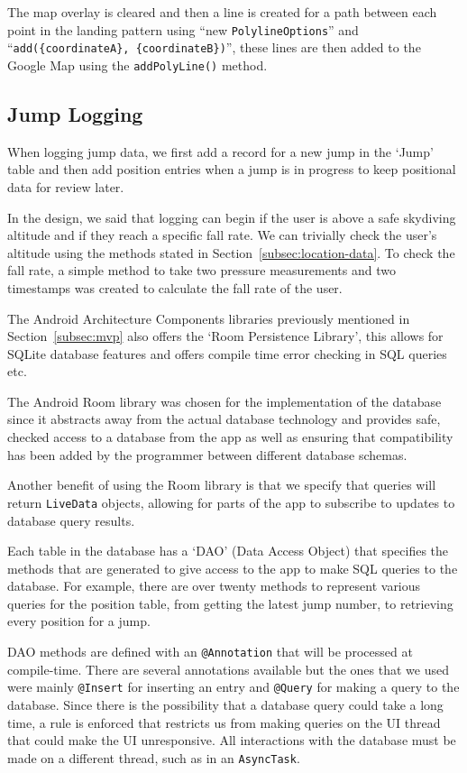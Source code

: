 The map overlay is cleared and then a line is created for a path between each point in the landing pattern using ``new \texttt{PolylineOptions}'' and ``\verb|add({coordinateA}, {coordinateB})|'', these lines are then added to the Google Map using the \texttt{addPolyLine()} method.

\newpage
\subsection{Jump Logging}
When logging jump data, we first add a record for a new jump in the `Jump' table and then add position entries when a jump is in progress to keep positional data for review later.

In the design, we said that logging can begin if the user is above a safe skydiving altitude and if they reach a specific fall rate. We can trivially check the user's altitude using the methods stated in Section~\ref{subsec:location-data}. To check the fall rate, a simple method to take two pressure measurements and two timestamps was created to calculate the fall rate of the user.

The Android Architecture Components libraries previously mentioned in Section~\ref{subsec:mvp} also offers the `Room Persistence Library', this allows for SQLite database features and offers compile time error checking in SQL queries etc.

The Android Room library was chosen for the implementation of the database since it abstracts away from the actual database technology and provides safe, checked access to a database from the app as well as ensuring that compatibility has been added by the programmer between different database schemas.

Another benefit of using the Room library is that we specify that queries will return \texttt{LiveData} objects, allowing for parts of the app to subscribe to updates to database query results.

Each table in the database has a `DAO' (Data Access Object) that specifies the methods that are generated to give access to the app to make SQL queries to the database. For example, there are over twenty methods to represent various queries for the position table, from getting the latest jump number, to retrieving every position for a jump.

DAO methods are defined with an \texttt{@Annotation} that will be processed at compile-time. There are several annotations available but the ones that we used were mainly \texttt{@Insert} for inserting an entry and \texttt{@Query} for making a query to the database. Since there is the possibility that a database query could take a long time, a rule is enforced that restricts us from making queries on the UI thread that could make the UI unresponsive. All interactions with the database must be made on a different thread, such as in an \texttt{AsyncTask}.


